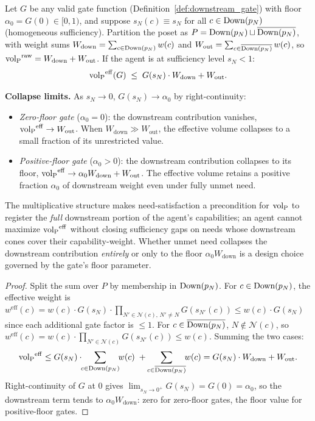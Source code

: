 \begin{proposition}
\label{prop:near_total_collapse}
Let $G$ be any valid gate function
(Definition~\ref{def:downstream_gate}) with floor $\alpha_0 =
G(0) \in [0, 1)$, and suppose $s_N(c) \equiv s_N$ for all $c \in
\mathrm{Down}(p_N)$ (homogeneous sufficiency).  Partition the poset as
$P = \mathrm{Down}(p_N) \sqcup \overline{\mathrm{Down}(p_N)}$, with weight sums
$W_{\mathrm{down}} = \sum_{c \in \mathrm{Down}(p_N)} w(c)$ and
$W_{\mathrm{out}} = \sum_{c \in \overline{\mathrm{Down}(p_N)}} w(c)$, so
${\operatorname{vol}_{\mathrm{P}}}^{\mathrm{raw}} = W_{\mathrm{down}} + W_{\mathrm{out}}$.
If the agent is at sufficiency level $s_N < 1$:
\[
  {\operatorname{vol}_{\mathrm{P}}}^{\mathrm{eff}}(G)
  \;\leq\; G(s_N) \cdot W_{\mathrm{down}} + W_{\mathrm{out}}.
\]

\medskip\noindent
\textbf{Collapse limits.}
As $s_N \to 0$, $G(s_N) \to \alpha_0$ by right-continuity:
\begin{itemize}
\item \emph{Zero-floor gate} ($\alpha_0 = 0$): the downstream
  contribution vanishes, ${\operatorname{vol}_{\mathrm{P}}}^{\mathrm{eff}} \to
  W_{\mathrm{out}}$.  When $W_{\mathrm{down}} \gg
  W_{\mathrm{out}}$, the effective volume collapses to a small
  fraction of its unrestricted value.
\item \emph{Positive-floor gate} ($\alpha_0 > 0$): the
  downstream contribution collapses to its floor,
  ${\operatorname{vol}_{\mathrm{P}}}^{\mathrm{eff}} \to \alpha_0 W_{\mathrm{down}} +
  W_{\mathrm{out}}$.  The effective volume retains a positive
  fraction $\alpha_0$ of downstream weight even under fully
  unmet need.
\end{itemize}

\medskip\noindent
The multiplicative structure makes need-satisfaction a
precondition for ${\operatorname{vol}_{\mathrm{P}}}$ to register the \emph{full} downstream
portion of the agent's capabilities; an agent cannot maximize
${\operatorname{vol}_{\mathrm{P}}}^{\mathrm{eff}}$ without closing sufficiency gaps on needs
whose downstream cones cover their capability-weight.  Whether
unmet need collapses the downstream contribution \emph{entirely}
or only to the floor $\alpha_0 W_{\mathrm{down}}$ is a design
choice governed by the gate's floor parameter.
\end{proposition}

\begin{proof}
Split the sum over $P$ by membership in $\mathrm{Down}(p_N)$.  For
$c \in \mathrm{Down}(p_N)$, the effective weight is
$w^{\mathrm{eff}}(c) = w(c) \cdot G(s_N) \cdot \prod_{N' \in
\mathcal{N}(c),\, N' \neq N} G(s_{N'}(c)) \leq w(c) \cdot G(s_N)$
since each additional gate factor is $\leq 1$.  For
$c \in \overline{\mathrm{Down}(p_N)}$, $N \notin \mathcal{N}(c)$, so
$w^{\mathrm{eff}}(c) = w(c) \cdot \prod_{N' \in \mathcal{N}(c)}
G(s_{N'}(c)) \leq w(c)$.  Summing the two cases:
\[
  \volL^{\mathrm{eff}}
  \leq G(s_N) \cdot \!\!\sum_{c \in \Down(p_N)}\!\! w(c)
       \;+\; \!\!\sum_{c \in \overline{\Down(p_N)}}\!\! w(c)
  = G(s_N) \cdot W_{\mathrm{down}} + W_{\mathrm{out}}.
\]
Right-continuity of $G$ at $0$ gives $\lim_{s_N \to 0^+} G(s_N)
= G(0) = \alpha_0$, so the downstream term tends to $\alpha_0
W_{\mathrm{down}}$: zero for zero-floor gates, the floor value
for positive-floor gates.
\end{proof}

